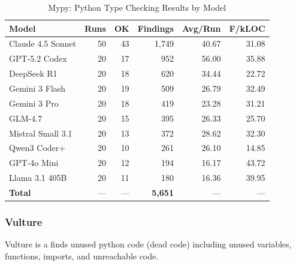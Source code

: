\begin{table}[htbp]
    \centering
    \caption{Mypy: Python Type Checking Results by Model}
    \label{tab:tool_mypy}
    \small
    \begin{tabular}{@{} l r r r r r @{}}
        \toprule
        \textbf{Model} & \textbf{Runs} & \textbf{OK} & \textbf{Findings} & \textbf{Avg/Run} & \textbf{F/kLOC} \\
        \midrule
        Claude 4.5 Sonnet & 50 & 43 & 1{,}749 & 40.67 & 31.08 \\
        GPT-5.2 Codex & 20 & 17 & 952 & 56.00 & 35.88 \\
        DeepSeek R1 & 20 & 18 & 620 & 34.44 & 22.72 \\
        Gemini 3 Flash & 20 & 19 & 509 & 26.79 & 32.49 \\
        Gemini 3 Pro & 20 & 18 & 419 & 23.28 & 31.21 \\
        GLM-4.7 & 20 & 15 & 395 & 26.33 & 25.70 \\
        Mistral Small 3.1 & 20 & 13 & 372 & 28.62 & 32.30 \\
        Qwen3 Coder+ & 20 & 10 & 261 & 26.10 & 14.85 \\
        GPT-4o Mini & 20 & 12 & 194 & 16.17 & 43.72 \\
        Llama 3.1 405B & 20 & 11 & 180 & 16.36 & 39.95 \\
        \midrule
        \textbf{Total} & --- & --- & \textbf{5{,}651} & --- & --- \\
        \bottomrule
    \end{tabular}
\end{table}

\subsubsection{Vulture}

Vulture is a finds unused python code (dead code) including unused variables, functions, imports, and unreachable code.

